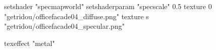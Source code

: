 setshader "specmapworld"
setshaderparam "specscale" 0.5
texture 0 "getridou/officefacade04_diffuse.png"
texture s "getridou/officefacade04_specular.png"

texeffect "metal"

